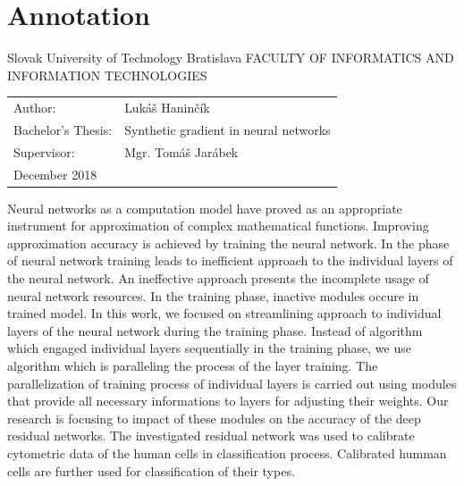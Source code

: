 \documentclass[12pt, twoside]{book}
\newcommand{\itab}[1]{\hspace{0em}\rlap{#1}}
\newcommand{\tab}[1]{\hspace{.31\textwidth}\rlap{#1}}
\begin{document}


\newpage 
\afterpage{\null\thispagestyle{empty}\newpage}
\section*{Annotation}
Slovak University of Technology Bratislava
\newline
FACULTY OF INFORMATICS AND INFORMATION TECHNOLOGIES
\newline
\itab{Degree course:}    \tab{Informatics}
\begin{table}[h!]
\renewcommand{\arraystretch}{1.4}
\begin{tabular}{@{}p{45mm}l}
Author: & Lukáš Haninčík \\
Bachelor’s Thesis: & Synthetic gradient in neural networks \\
Supervisor: & Mgr. Tomáš Jarábek \\
December 2018
\end{tabular}
\end{table}
\newline
\newline
Neural networks as a computation model have proved as an appropriate instrument for approximation of complex mathematical functions. Improving approximation accuracy is achieved by training the neural network. In the phase of neural network training leads to inefficient approach to the individual layers of the neural network. An ineffective approach presents the incomplete usage of neural network resources. In the training phase, inactive modules occure in trained model. In this work, we focused on streamlining approach to individual layers of the neural network during the training phase. Instead of algorithm which engaged individual layers sequentially in the training phase, we use algorithm which is paralleling the process of the layer training. The parallelization of training process of individual layers is carried out using modules that provide all necessary informations to layers for adjusting their weights. Our research is focusing to impact of these modules on the accuracy of the deep residual networks. The investigated residual network was used to calibrate cytometric data of the human cells in classification process. Calibrated humman cells are further used for classification of their types.
\end{document}
